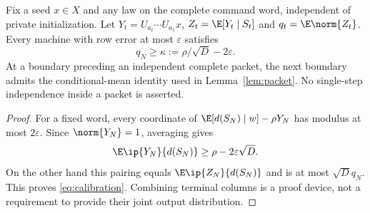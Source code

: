 \begin{lemma}\label{lem:calibration}
Fix a seed $x\in X$ and any law on the complete command word, independent of private initialization. Let $Y_t=U_{a_t}\cdots U_{a_1}x$, $Z_t=\E[Y_t\mid S_t]$ and $q_t=\E\norm{Z_t}$. Every machine with row error at most $\varepsilon$ satisfies
\begin{equation}\label{eq:calibration}
 q_N\ge\kappa:=\rho/\sqrt D-2\varepsilon.
\end{equation}
At a boundary preceding an independent complete packet, the next boundary admits the conditional-mean identity used in Lemma~\ref{lem:packet}. No single-step independence inside a packet is asserted.
\end{lemma}
\begin{proof}
For a fixed word, every coordinate of $\E[d(S_N)\mid w]-\rho Y_N$ has modulus at most $2\varepsilon$. Since $\norm{Y_N}=1$, averaging gives
\[
 \E\ip{Y_N}{d(S_N)}\ge\rho-2\varepsilon\sqrt D.
\]
On the other hand this pairing equals $\E\ip{Z_N}{d(S_N)}$ and is at most $\sqrt D q_N$. This proves \eqref{eq:calibration}. Combining terminal columns is a proof device, not a requirement to provide their joint output distribution.
\end{proof}
